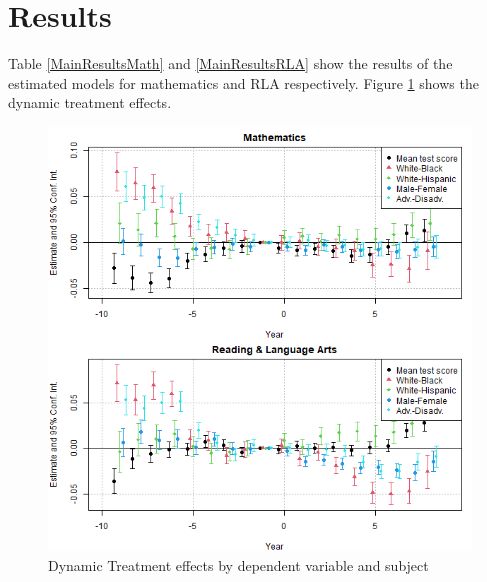 \section{Results}

Table \ref{MainResultsMath} and \ref{MainResultsRLA} show the results of the estimated models for mathematics and RLA respectively. Figure \ref{ResultsPlot} shows the dynamic treatment effects.





\begin{figure}[!h]
	\centering
	\includegraphics[scale=0.7]{"../Code & Data/ResultsPlot.png"}
	\caption{Dynamic Treatment effects by dependent variable and subject}
	\label{ResultsPlot}
\end{figure}




